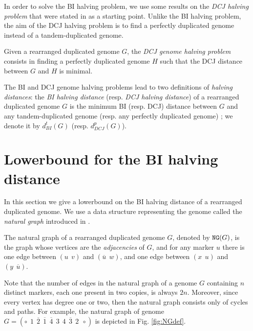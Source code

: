 \documentclass{llncs}
\newcommand{\fst}[1]{ \ensuremath{#1} }
\newcommand{\snd}[1]{ \ensuremath{\overline{#1}} }
\newcommand\aff[2]{\ensuremath{(\fst{#1}~~\fst{#2})}}
\newcommand\asf[2]{\ensuremath{(\snd{#1}~~\fst{#2})}}
\newcommand\afs[2]{\ensuremath{(\fst{#1}~~\snd{#2})}}
\renewcommand{\NG}{\ensuremath{\mbox{\texttt{NG}}}}
\begin{document}
In order to solve the BI halving problem, we use some results on the \emph{DCJ halving problem} that were stated in \cite{Mixtacki08} as a starting point. Unlike the BI halving problem, the aim of the DCJ halving problem is to find a perfectly duplicated genome instead of a tandem-duplicated genome.

\begin{definition}
Given a rearranged duplicated genome $G$, the \emph{DCJ genome halving problem} 
consists in finding a perfectly duplicated genome $H$ such that the DCJ distance
between $G$ and $H$ is minimal.
\end{definition}

The BI and DCJ genome halving problems lead to two definitions of \emph{halving distances}: the \emph{BI halving distance} (resp. \emph{DCJ halving distance}) of a rearranged duplicated genome $G$ is the minimum BI (resp. DCJ) distance between $G$ and any tandem-duplicated genome (resp. any perfectly duplicated genome) ; we denote it by $d^t_{BI}(G)$ (resp. $d^p_{DCJ}(G)$).\\

\section{Lowerbound for the BI halving distance}
\label{sec:lb}

In this section we give a lowerbound on the BI halving distance of a rearranged duplicated genome. We use a data structure representing the genome called the \emph{natural graph} introduced in \cite{Mixtacki08}. 


\begin{definition}
The natural graph of a rearranged duplicated genome $G$, denoted by $\NG(G)$, is the graph whose vertices are the \emph{adjacencies} of $G$, and for any marker $u$ there is one edge between  $\aff{u}{v}$ and  $\asf{u}{w}$, and  one edge between  $\aff{x}{u}$ and  $\afs{y}{u}$.
\end{definition}


Note that the number of edges in the natural graph of a genome $G$ containing $n$ distinct markers, each one present in two copies, is always $2n$. Moreover, since every vertex has degree one or two, then the natural graph consists only of cycles and paths. For example, the natural graph of genome $G = (\circ~~ \fst{1}~~\snd{2}~~\snd{1}~~\snd{4}~~\fst{3}~~\fst{4}~~\snd{3}~~\fst{2}~~\circ)$ is depicted in Fig. \ref{fig:NGdef}.
\end{document}
